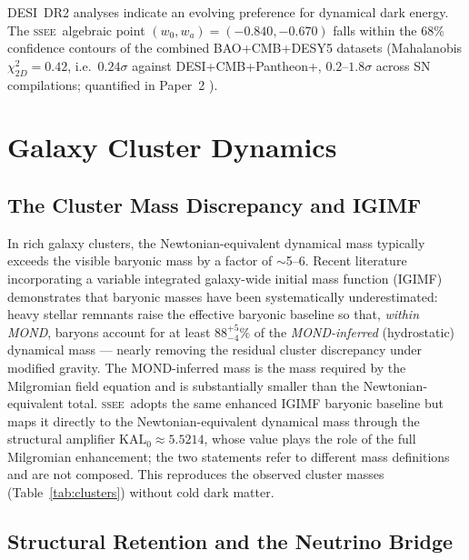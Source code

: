 \documentclass[12pt,a4paper]{article}
\newcommand{\SSEE}{\ifmmode\mathrm{SSEE}\else\textsc{ssee}\fi}
\newcommand{\KALz}{\mathrm{KAL}_0}
\newcommand{\wz}{w_0}
\newcommand{\wa}{w_a}
\begin{document}
DESI~DR2 \citep{AbdulKarim2025} analyses indicate an evolving preference for dynamical
dark energy. The \SSEE\ algebraic point $(\wz,\wa)=(-0.840,-0.670)$ falls within the
68\% confidence contours of the combined BAO+CMB+DESY5 datasets
(Mahalanobis $\chi^2_{2D}=0.42$, i.e.\ $0.24\sigma$ against DESI+CMB+Pantheon+, $0.2$--$1.8\sigma$ across SN compilations; quantified in Paper~2
\citep{SSEE_paperII}).

\section{Galaxy Cluster Dynamics}
\label{sec:clusters}

\subsection{The Cluster Mass Discrepancy and IGIMF}

In rich galaxy clusters, the Newtonian-equivalent dynamical mass typically exceeds
the visible baryonic mass by a factor of $\sim$5--6. Recent literature incorporating
a variable integrated galaxy-wide initial mass function (IGIMF)
\citep{Kroupa2003,Zhang2026} demonstrates that baryonic masses have been systematically
underestimated: heavy stellar remnants raise the effective baryonic baseline so that,
\emph{within MOND}, baryons account for at least $88^{+5}_{-4}\%$ of the
\emph{MOND-inferred} (hydrostatic) dynamical mass \citep{Zhang2026} --- nearly removing
the residual cluster discrepancy under modified gravity. The MOND-inferred mass is the
mass required by the Milgromian field equation and is substantially smaller than the
Newtonian-equivalent total. \SSEE\ adopts the same enhanced IGIMF baryonic baseline but
maps it directly to the Newtonian-equivalent dynamical mass through the structural
amplifier $\KALz \approx 5.5214$, whose value plays the role of the full Milgromian
enhancement; the two statements refer to different mass definitions and are not composed.
This reproduces the observed cluster masses (Table~\ref{tab:clusters}) without cold dark
matter.

\subsection{Structural Retention and the Neutrino Bridge}
\end{document}
